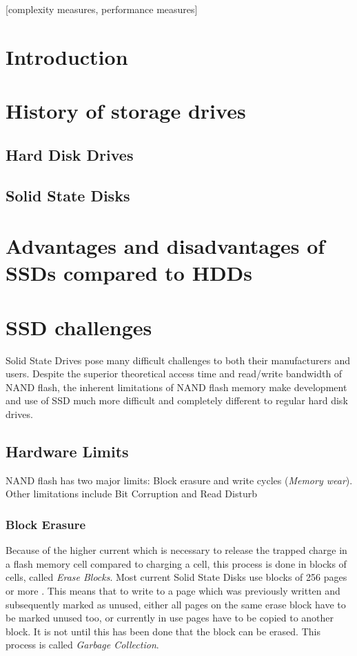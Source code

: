 \documentclass{acm_proc_article-sp}
\begin{document}
[complexity measures, performance measures]

\section{Introduction}

\section{History of storage drives}

\subsection{Hard Disk Drives}

\subsection{Solid State Disks}

\section{Advantages and disadvantages of SSDs compared to HDDs}

\section{SSD challenges}

Solid State Drives pose many difficult challenges to both their manufacturers and users. Despite the superior theoretical access time and read/write bandwidth of NAND flash, the inherent limitations of NAND flash memory make development and use of SSD much more difficult and completely different to regular hard disk drives.

\subsection{Hardware Limits}
NAND flash has two major limits: Block erasure and write cycles (\emph{Memory wear}). Other limitations include Bit Corruption and Read Disturb

\subsubsection*{Block Erasure}
Because of the higher current which is necessary to release the trapped charge in a flash memory cell compared to charging a cell, this process is done in blocks of cells, called \emph{Erase Blocks}. Most current Solid State Disks use blocks of 256 pages or more \cite{codecapsule2014coding}.
This means that to write to a page which was previously written and subsequently marked as unused, either all pages on the same erase block have to be marked unused too, or currently in use pages have to be copied to another block. It is not until this has been done that the block can be erased. This process is called \emph{Garbage Collection}.
\end{document}
